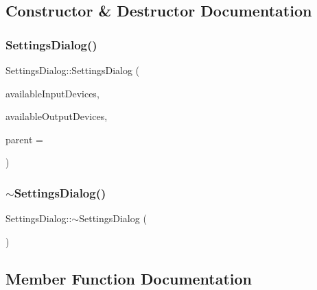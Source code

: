 \subsection{Constructor \& Destructor Documentation}
\hypertarget{class_settings_dialog_a50d64f2aa1317e9b10bd2ea1a6c011bb}{}\label{class_settings_dialog_a50d64f2aa1317e9b10bd2ea1a6c011bb} 
\subsubsection{\texorpdfstring{Settings\+Dialog()}{SettingsDialog()}}
{\footnotesize\ttfamily Settings\+Dialog\+::\+Settings\+Dialog (\begin{DoxyParamCaption}\item[{const Q\+List$<$ Q\+Audio\+Device\+Info $>$ \&}]{available\+Input\+Devices,  }\item[{const Q\+List$<$ Q\+Audio\+Device\+Info $>$ \&}]{available\+Output\+Devices,  }\item[{Q\+Widget $\ast$}]{parent = {} }\end{DoxyParamCaption})}

\hypertarget{class_settings_dialog_ac48f54d4472902be0a3845a69167f068}{}\label{class_settings_dialog_ac48f54d4472902be0a3845a69167f068} 
\subsubsection{\texorpdfstring{$\sim$\+Settings\+Dialog()}{~SettingsDialog()}}
{\footnotesize\ttfamily Settings\+Dialog\+::$\sim$\+Settings\+Dialog (\begin{DoxyParamCaption}{ }\end{DoxyParamCaption})}



\subsection{Member Function Documentation}
\hypertarget{class_settings_dialog_a40d1decb770fb1fa322bd6e11ed3805f}{}\label{class_settings_dialog_a40d1decb770fb1fa322bd6e11ed3805f} 
